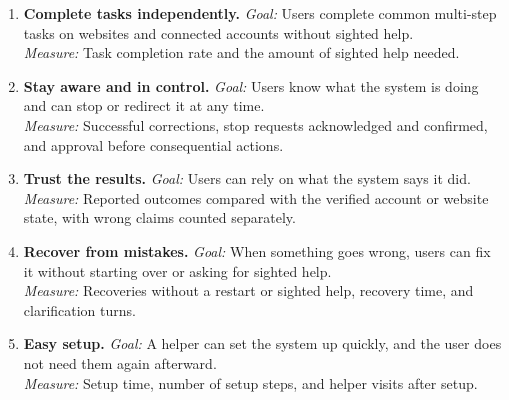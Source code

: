 \documentclass[11pt]{article}
\begin{document}
\begin{enumerate}[label=G\arabic*.,leftmargin=*]
\item \textbf{Complete tasks independently.}
\textit{Goal:} Users complete common multi-step tasks on websites and connected accounts without sighted help.\\
\textit{Measure:} Task completion rate and the amount of sighted help needed.

\item \textbf{Stay aware and in control.}
\textit{Goal:} Users know what the system is doing and can stop or redirect it at any time.\\
\textit{Measure:} Successful corrections, stop requests acknowledged and confirmed, and approval before consequential actions.

\item \textbf{Trust the results.}
\textit{Goal:} Users can rely on what the system says it did.\\
\textit{Measure:} Reported outcomes compared with the verified account or website state, with wrong claims counted separately.

\item \textbf{Recover from mistakes.}
\textit{Goal:} When something goes wrong, users can fix it without starting over or asking for sighted help.\\
\textit{Measure:} Recoveries without a restart or sighted help, recovery time, and clarification turns.

\item \textbf{Easy setup.}
\textit{Goal:} A helper can set the system up quickly, and the user does not need them again afterward.\\
\textit{Measure:} Setup time, number of setup steps, and helper visits after setup.
\end{enumerate}
\end{document}
